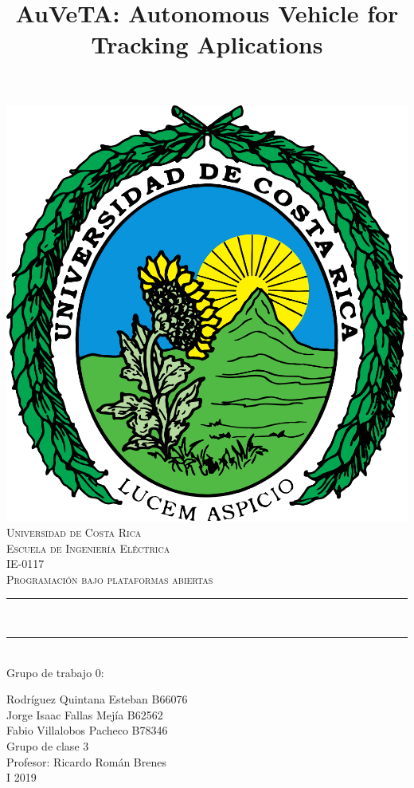 \documentclass[12pt]{article}
\title {AuVeTA: Autonomous Vehicle for Tracking Aplications\\[1 cm]}
\makeatletter
\let\thetitle\@title
\makeatother
\begin{document}
\begin{titlepage}


\centering
\includegraphics[width=4 cm]{imagenes/LOGO}\\[1 cm]

	\centering
    \textsc{\LARGE Universidad de Costa Rica}\\	%
	\textsc{ \Large{Escuela de Ingeniería Eléctrica} \\  \large{IE-0117 \\ Programación bajo plataformas abiertas}}  \\[0.5 cm]
	
	\rule{\linewidth}{0.2 mm} \\[0.4 cm]
	{ \huge \bfseries \thetitle}
	\rule{\linewidth}{0.2 mm} \\[1 cm]
	
    Grupo de trabajo 0:

		 Rodríguez Quintana Esteban\hspace{1.5 cm} B66076     \\
		 Jorge Isaac Fallas Mejía\hspace{1.5 cm} B62562 \\
		 Fabio Villalobos Pacheco   \hspace{1.5 cm} B78346\\[2 cm]

	{ Grupo de clase 3} \\				%
	 \normalsize Profesor: Ricardo Román Brenes\\[1 cm]

	
		I 2019
	
    
    
    
    
	
\end{titlepage}


\tableofcontents
\pagebreak
\pagebreak

\end{document}
